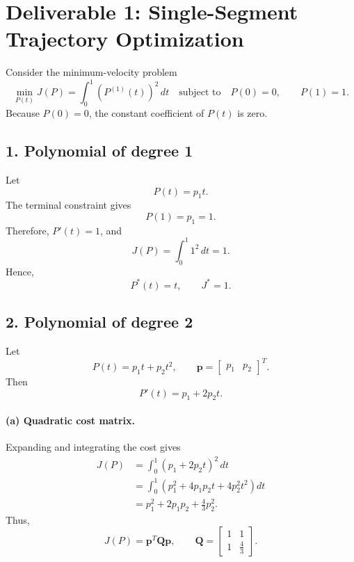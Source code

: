 \documentclass[11pt]{article}
\begin{document}
\section*{Deliverable 1: Single-Segment Trajectory Optimization}

Consider the minimum-velocity problem
\begin{equation}
    \min_{P(t)} J(P)
    = \int_0^1 \left(P^{(1)}(t)\right)^2\,dt
    \quad \text{subject to} \quad
    P(0)=0, \qquad P(1)=1.
\end{equation}
Because $P(0)=0$, the constant coefficient of $P(t)$ is zero.

\subsection*{1. Polynomial of degree 1}

Let
\begin{equation}
    P(t)=p_1t.
\end{equation}
The terminal constraint gives
\begin{equation}
    P(1)=p_1=1.
\end{equation}
Therefore, $P'(t)=1$, and
\begin{equation}
    J(P)=\int_0^1 1^2\,dt=1.
\end{equation}
Hence,
\begin{equation}
    \boxed{P^*(t)=t, \qquad J^*=1.}
\end{equation}

\subsection*{2. Polynomial of degree 2}

Let
\begin{equation}
    P(t)=p_1t+p_2t^2,
    \qquad
    \mathbf{p}=\begin{bmatrix}p_1 & p_2\end{bmatrix}^{T}.
\end{equation}
Then
\begin{equation}
    P'(t)=p_1+2p_2t.
\end{equation}

\paragraph{(a) Quadratic cost matrix.}
Expanding and integrating the cost gives
\begin{align}
    J(P)
    &=\int_0^1 (p_1+2p_2t)^2\,dt \\
    &=\int_0^1
      \left(p_1^2+4p_1p_2t+4p_2^2t^2\right)dt \\
    &=p_1^2+2p_1p_2+\frac{4}{3}p_2^2.
\end{align}
Thus,
\begin{equation}
    J(P)=\mathbf{p}^{T}\mathbf{Q}\mathbf{p},
    \qquad
    \boxed{
    \mathbf{Q}=\begin{bmatrix}
        1 & 1 \\
        1 & \frac{4}{3}
    \end{bmatrix}.}
\end{equation}
\end{document}
